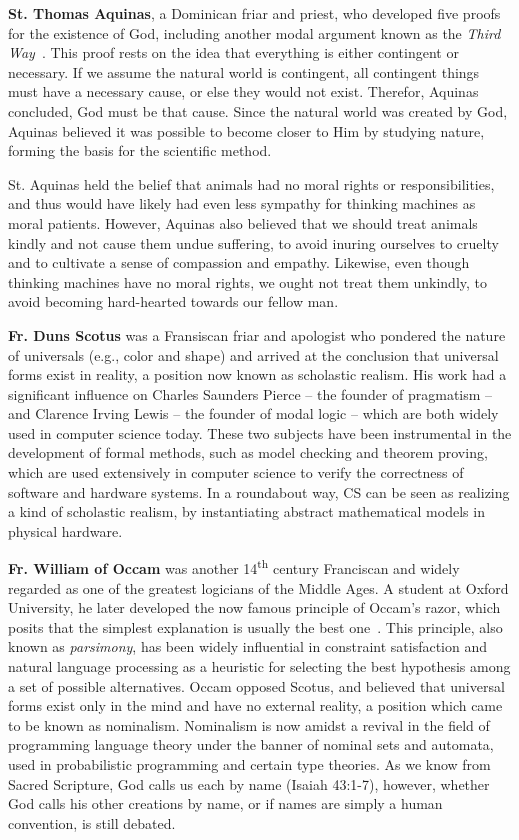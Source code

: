 \documentclass[sigplan,nonacm]{acmart}\settopmatter{printfolios=false,printccs=false,printacmref=false}
\begin{document}
  \textbf{St. Thomas Aquinas}, a Dominican friar and priest, who developed five proofs for the existence of God, including another modal argument known as the \textit{Third Way}~\cite{aquinas2008summa}. This proof rests on the idea that everything is either contingent or necessary. If we assume the natural world is contingent, all contingent things must have a necessary cause, or else they would not exist. Therefor, Aquinas concluded, God must be that cause. Since the natural world was created by God, Aquinas believed it was possible to become closer to Him by studying nature, forming the basis for the scientific method.

  St. Aquinas held the belief that animals had no moral rights or responsibilities, and thus would have likely had even less sympathy for thinking machines as moral patients. However, Aquinas also believed that we should treat animals kindly and not cause them undue suffering, to avoid inuring ourselves to cruelty and to cultivate a sense of compassion and empathy. Likewise, even though thinking machines have no moral rights, we ought not treat them unkindly, to avoid becoming hard-hearted towards our fellow man.

  \textbf{Fr. Duns Scotus} was a Fransiscan friar and apologist who pondered the nature of universals (e.g., color and shape) and arrived at the conclusion that universal forms exist in reality, a position now known as scholastic realism. His work had a significant influence on Charles Saunders Pierce -- the founder of pragmatism -- and Clarence Irving Lewis -- the founder of modal logic -- which are both widely used in computer science today. These two subjects have been instrumental in the development of formal methods, such as model checking and theorem proving, which are used extensively in computer science to verify the correctness of software and hardware systems. In a roundabout way, CS can be seen as realizing a kind of scholastic realism, by instantiating abstract mathematical models in physical hardware.

  \textbf{Fr. William of Occam} was another 14\textsuperscript{th} century Franciscan and widely regarded as one of the greatest logicians of the Middle Ages. A student at Oxford University, he later developed the now famous principle of Occam's razor, which posits that the simplest explanation is usually the best one~\cite{occam1495quaestiones}. This principle, also known as \textit{parsimony}, has been widely influential in constraint satisfaction and natural language processing as a heuristic for selecting the best hypothesis among a set of possible alternatives. Occam opposed Scotus, and believed that universal forms exist only in the mind and have no external reality, a position which came to be known as nominalism. Nominalism is now amidst a revival in the field of programming language theory under the banner of nominal sets and automata, used in probabilistic programming and certain type theories. As we know from Sacred Scripture, God calls us each by name (Isaiah 43:1-7), however, whether God calls his other creations by name, or if names are simply a human convention, is still debated.
\end{document}
